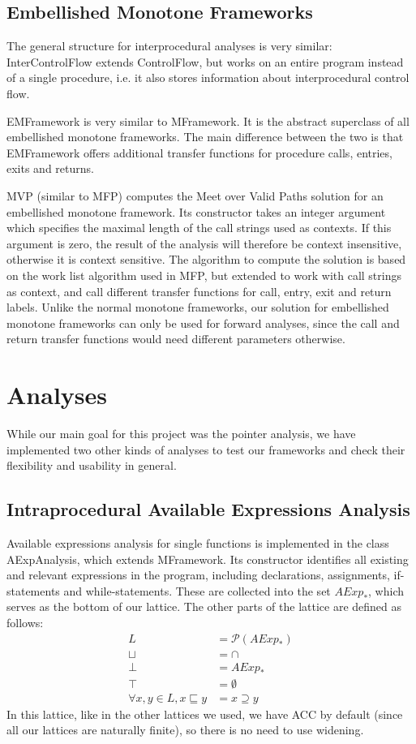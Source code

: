 \documentclass[a4paper,11pt]{article}
\begin{document}
\subsection{Embellished Monotone Frameworks}
The general structure for interprocedural analyses is very similar:
InterControlFlow extends ControlFlow, but works on an entire program instead of a single procedure, i.e. it also stores information about interprocedural control flow. 

EMFramework is very similar to MFramework. It is the abstract superclass of all embellished monotone frameworks. The main difference between the two is that EMFramework offers additional transfer functions for procedure calls, entries, exits and returns.

MVP (similar to MFP) computes the Meet over Valid Paths solution for an embellished monotone framework. Its constructor takes an integer argument which specifies the maximal length of the call strings used as contexts. If this argument is zero, the result of the analysis will therefore be context insensitive, otherwise it is context sensitive. The algorithm to compute the solution is based on the work list algorithm used in MFP, but extended to work with call strings as context, and call different transfer functions for call, entry, exit and return labels.
Unlike the normal monotone frameworks, our solution for embellished monotone frameworks can only be used for forward analyses, since the call and return transfer functions would need different parameters otherwise.

\section{Analyses}
While our main goal for this project was the pointer analysis, we have implemented two other kinds of analyses to test our frameworks and check their flexibility and usability in general.

\subsection{Intraprocedural Available Expressions Analysis}
Available expressions analysis for single functions is implemented in the class AExpAnalysis, which extends MFramework. Its constructor identifies all existing and relevant expressions in the program, including declarations, assignments, if-statements and while-statements. These are collected into the set $AExp_*$, which serves as the bottom of our lattice. The other parts of the lattice are defined as follows:
\begin{align*}
  L &= \mathcal{P}(\textbf{$AExp_*$})\\
  \sqcup &= \cap \\
  \bot  &= \textbf{$AExp_*$}\\
  \top &= \emptyset \\
  \forall x, y \in L, x \sqsubseteq y &= x \supseteq y
\end{align*}
In this lattice, like in the other lattices we used, we have ACC by default (since all our lattices are naturally finite), so there is no need to use widening. 
\end{document}
